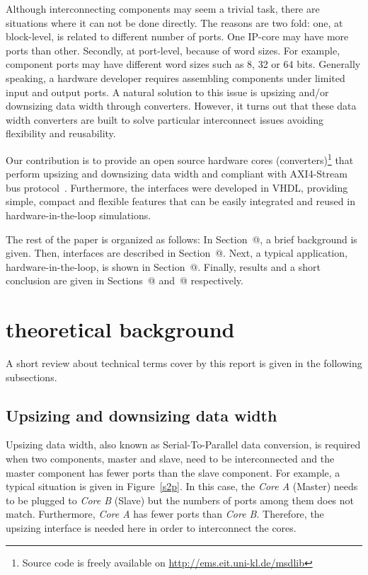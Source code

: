 \documentclass[10pt, conference, compsocconf]{IEEEtran}
\makeatletter
\newcommand{\rmnum}[1]{\expandafter\@slowromancap\romannumeral #1@}
\makeatother
\begin{document}
Although interconnecting components may seem a trivial task, there are situations where it can not be done directly. The reasons are two fold: one, at block-level, is related to different number of ports. One IP-core may have more ports than other. Secondly, at port-level, because of word sizes. For example, component ports may have different word sizes such as 8, 32 or 64 bits. Generally speaking, a
hardware developer requires assembling components under limited input and output ports. A natural solution to this issue is upsizing and/or downsizing data width through converters. However, it turns out that these data width converters are built to solve particular interconnect issues avoiding flexibility and reusability.

Our contribution is to provide an open source hardware cores (converters)\footnote{Source code is freely available on \url{http://ems.eit.uni-kl.de/msdlib}} that perform upsizing and downsizing data width and compliant with AXI4-Stream bus protocol~\cite{AXI4}. Furthermore, the interfaces were developed in VHDL, providing simple, compact and flexible features that can be easily integrated and reused in hardware-in-the-loop simulations.

The rest of the paper is organized as follows: In Section~\rmnum{2}, a brief background is given. Then, interfaces are described in Section~\rmnum{3}. Next, a typical application, hardware-in-the-loop, is shown in Section~\rmnum{4}. Finally, results and a short conclusion are given in Sections~\rmnum{5} and~\rmnum{6} respectively.

\section{theoretical background}

A short review about technical terms cover by this report is given in the following subsections.

\subsection{Upsizing and downsizing data width}

Upsizing data width, also known as Serial-To-Parallel data conversion, is required when two components, master and slave, need to be interconnected and the master component has fewer ports than the slave component. For example, a typical situation is given in Figure~\ref{s2p}. In this case, the {\it Core A} (Master) needs to be plugged to {\it Core B} (Slave) but the numbers of ports among them does not match. Furthermore, {\it Core A} has fewer ports than {\it Core B}. Therefore, the upsizing interface is needed here in order to interconnect the cores.
\end{document}
